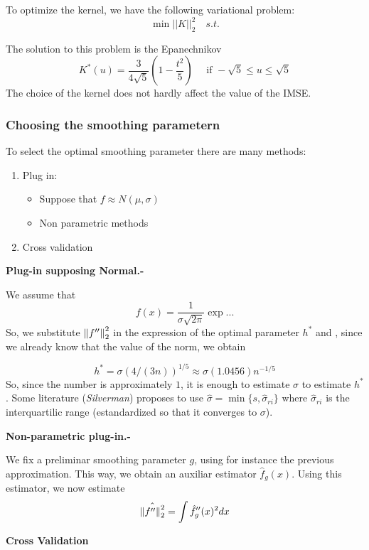To optimize the kernel, we have the following variational problem:
\[
\min ||K||^2_2 \quad s.t.
\]

The solution to this problem is the Epanechnikov
\[
K^*(u) = \frac{3}{4\sqrt{5}} \left( 1 - \frac{t^2}{5}\right) \quad \text{ if } -\sqrt{5} \leq u \leq \sqrt{5}
\]
The choice of the kernel does not hardly affect the value of the IMSE.


\subsubsection{Choosing the smoothing parametern}
To select the optimal smoothing parameter there are many methods:

\begin{enumerate}
\item Plug in:
  \begin{itemize}
  \item Suppose that $f \approx N(\mu,\sigma)$
    \item Non parametric methods
  \end{itemize}
  \item Cross validation
\end{enumerate}

\textbf{Plug-in supposing Normal.-}

We assume that
\[
f(x) = \frac{1}{\sigma \sqrt{2\pi}}\exp...
\]
So, we substitute \(\left\lVert f''\right\rVert_2^2\) in the expression of the optimal parameter \(h^*\) and , since we already know that the value of the norm, we obtain

\[
h^* = \sigma(4/(3n))^{1/5} \approx \sigma(1.0456)n^{-1/5}
\]
So, since the number is approximately \(1\), it is enough to estimate \(\sigma\) to estimate \(h^*\). Some literature (\emph{Silverman}) proposes to use \(\hat \sigma = \min \{ s,\hat\sigma_{ri}\}\) where \(\hat \sigma_{ri}\) is the interquartilic range (estandardized so that it converges to \(\sigma\)).


\textbf{Non-parametric plug-in.-}

We fix a preliminar smoothing parameter $g$, using for instance the previous approximation. This way, we obtain an auxiliar estimator \(\hat f_g (x) \). Using this estimator, we now estimate \[
\hat{\left\lVert f''\right\rVert_2^2} = \int \hat f_g ''(x)^2dx
  \]


  \textbf{ Cross Validation }


